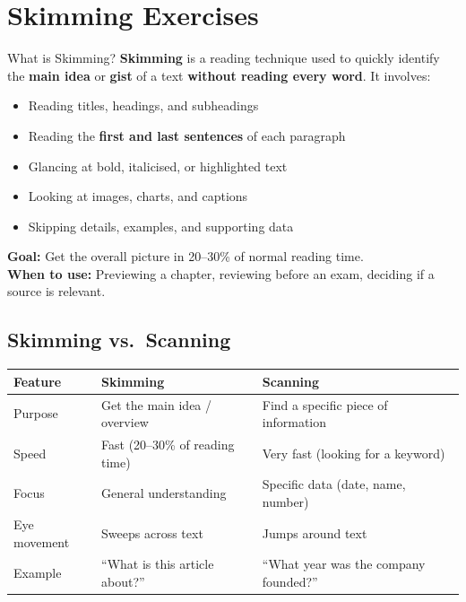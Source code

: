 \documentclass[12pt,a4paper]{article}
\begin{document}
\section{Skimming Exercises}

\begin{keybox}{What is Skimming?}
\textbf{Skimming} is a reading technique used to quickly identify the \textbf{main idea} or \textbf{gist} of a text \textbf{without reading every word}. It involves:
\begin{itemize}[noitemsep]
    \item Reading titles, headings, and subheadings
    \item Reading the \textbf{first and last sentences} of each paragraph
    \item Glancing at bold, italicised, or highlighted text
    \item Looking at images, charts, and captions
    \item Skipping details, examples, and supporting data
\end{itemize}
\textbf{Goal:} Get the overall picture in 20--30\% of normal reading time.\\
\textbf{When to use:} Previewing a chapter, reviewing before an exam, deciding if a source is relevant.
\end{keybox}

\subsection{Skimming vs.\ Scanning}

\begin{center}
\begin{tabular}{p{2.5cm}p{5cm}p{5cm}}
\toprule
\textbf{Feature} & \textbf{Skimming} & \textbf{Scanning} \\
\midrule
Purpose & Get the main idea / overview & Find a specific piece of information \\
Speed & Fast (20--30\% of reading time) & Very fast (looking for a keyword) \\
Focus & General understanding & Specific data (date, name, number) \\
Eye movement & Sweeps across text & Jumps around text \\
Example & ``What is this article about?'' & ``What year was the company founded?'' \\
\bottomrule
\end{tabular}
\end{center}
\end{document}

